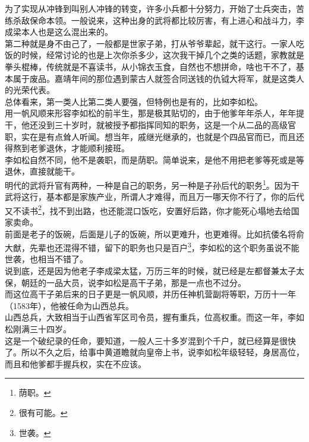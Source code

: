 \begin{multicols}{\theparacolNo}
为了实现从冲锋到叫别人冲锋的转变，许多小兵都十分努力，开始了士兵突击，苦练杀敌保命本领。一般说来，这种出身的武将都比较厉害，有上进心和战斗力，李成梁本人也是这么混出来的。\\

第二种就是身不由己了，一般都是世家子弟，打从爷爷辈起，就干这行。一家人吃饭的时候，经常讨论的也是上次你杀多少，这次我干掉几个之类的话题，家教就是拳头棍棒，传统就是不喜读书，从小锦衣玉食，自然也不想拼命，啥也干不了，基本属于废品。嘉靖年间的那位遇到蒙古人就签合同送钱的仇钺大将军，就是这类人的光荣代表。\\

总体看来，第一类人比第二类人要强，但特例也是有的，比如李如松。\\

用一帆风顺来形容李如松的前半生，那是极其贴切的，由于他爹年年杀人，年年提干，他还没到三十岁时，就被授予都指挥同知的职务，这是一个从二品的高级官职，实在是有点耸人听闻。想当年，戚继光继承的，也就是个四品官而已，而且还得熬到老爹退休，才能顺利接班。\\

李如松自然不同，他不是袭职，而是荫职。简单说来，是他不用把老爹等死或是等退休，直接就能干。\\

明代的武将升官有两种，一种是自己的职务，另一种是子孙后代的职务\footnote{荫职。}。因为干武将这行，基本都是家族产业，所谓人才难得，而且万一哪天你不行了，你的后代又不读书\footnote{很有可能。}，找不到出路，也还能混口饭吃，安置好后路，你才能死心塌地去给国家卖命。\\

前面是老子的饭碗，后面是儿子的饭碗，所以更难升，也更难得。比如抗倭名将俞大猷，先辈也还混得不错，留下的职务也只是百户\footnote{世袭。}，李如松的这个职务虽说不能世袭，也相当不错了。\\

说到底，还是因为他老子李成梁太猛，万历三年的时候，就已经是左都督兼太子太保，朝廷的一品大员，说李如松是高干子弟，那是一点也不过分。\\

而这位高干子弟后来的日子更是一帆风顺，并历任神机营副将等职，万历十一年（1583年），他被任命为山西总兵。\\

山西总兵，大致相当于山西省军区司令员，握有重兵，位高权重。而这一年，李如松刚满三十四岁。\\

这是一个破纪录的任命，要知道，一般人三十多岁混到个千户，就已经算是很快了。所以不久之后，给事中黄道瞻就向皇帝上书，说李如松年级轻轻，身居高位，而且和他爹都手握兵权，实在不应该。\\


\end{multicols}

